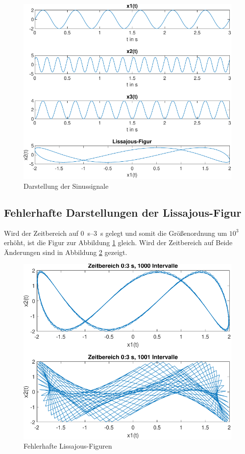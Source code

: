 \documentclass[
    paper=a4,
    fontsize=10pt,
    DIV=calc,
    twocolumn,
    oneside,
]{scrartcl}
\begin{document}
    \begin{figure}[hbt]
        \centering
        \includegraphics[width=\imagewidth]{../versuch1/sinus.pdf}
        \caption{Darstellung der Sinussignale}
        \label{fig:sinus}
    \end{figure}

    \subsection{Fehlerhafte Darstellungen der Lissajous-Figur}
        Wird der Zeitbereich auf \SIrange{0}{3}{\second} gelegt und somit die Größenordnung um \(10^3\) erhöht, ist die Figur zur Abbildung \ref{fig:sinus} gleich. Wird der Zeitbereich auf \missing
        Beide Änderungen sind in Abbildung \ref{fig:lissajous} gezeigt.

        \begin{figure}[hbt]
            \centering
            \includegraphics[width=\imagewidth]{../versuch1/lissjaou.pdf}
            \caption{Fehlerhafte Lissajous-Figuren}
            \label{fig:lissajous}
        \end{figure}
\end{document}
